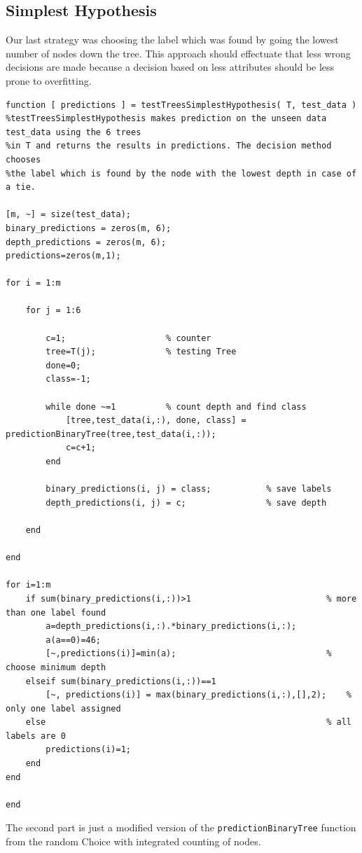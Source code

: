 \documentclass{article}
\begin{document}
\subsection{Simplest Hypothesis}
Our last strategy was choosing the label which was found by going the lowest number of nodes down the tree. This approach should effectuate that less wrong decisions are made because a decision based on less attributes should be less prone to overfitting.
\begin{lstlisting}
function [ predictions ] = testTreesSimplestHypothesis( T, test_data )
%testTreesSimplestHypothesis makes prediction on the unseen data test_data using the 6 trees
%in T and returns the results in predictions. The decision method chooses
%the label which is found by the node with the lowest depth in case of a tie.

[m, ~] = size(test_data);
binary_predictions = zeros(m, 6);
depth_predictions = zeros(m, 6);
predictions=zeros(m,1);

for i = 1:m
    
    for j = 1:6
        
        c=1;                    % counter             
        tree=T(j);              % testing Tree 
        done=0;
        class=-1; 
        
        while done ~=1          % count depth and find class
            [tree,test_data(i,:), done, class] = predictionBinaryTree(tree,test_data(i,:));
            c=c+1;
        end
        
        binary_predictions(i, j) = class;           % save labels
        depth_predictions(i, j) = c;                % save depth
        
    end
    
end

for i=1:m
    if sum(binary_predictions(i,:))>1                           % more than one label found
        a=depth_predictions(i,:).*binary_predictions(i,:);  
        a(a==0)=46;
        [~,predictions(i)]=min(a);                              % choose minimum depth
    elseif sum(binary_predictions(i,:))==1
        [~, predictions(i)] = max(binary_predictions(i,:),[],2);    % only one label assigned
    else                                                        % all labels are 0
        predictions(i)=1;                                      
    end
end

end
\end{lstlisting}
The second part is just a modified version of the \verb$predictionBinaryTree$ function from the random Choice with integrated counting of nodes.
\end{document}
